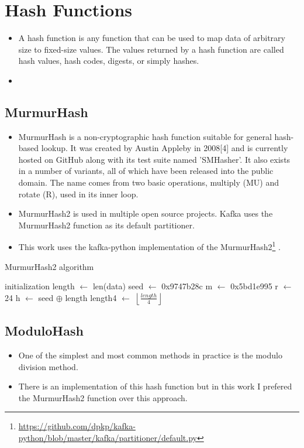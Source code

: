 \section{Hash Functions}
\label{sec:hash-functions}
\begin{itemize}
    \item A hash function is any function that can be used to map data of arbitrary size to fixed-size values. The values returned by a hash function are called hash values, hash codes, digests, or simply hashes.
    \item 
\end{itemize}


\subsection{MurmurHash}
\label{subsec:murmurhash}
\begin{itemize}
    \item MurmurHash is a non-cryptographic hash function suitable for general hash-based lookup. It was created by Austin Appleby in 2008[4] and is currently hosted on GitHub along with its test suite named 'SMHasher'. It also exists in a number of variants, all of which have been released into the public domain. The name comes from two basic operations, multiply (MU) and rotate (R), used in its inner loop.
    \item MurmurHash2 is used in multiple open source projects. Kafka uses the MurmurHash2 function as its default partitioner.
    \item This work uses the kafka-python implementation of the MurmurHash2\footnote{\url{https://github.com/dpkp/kafka-python/blob/master/kafka/partitioner/default.py}} .
\end{itemize}

\begin{algorithm}[H]
	\caption{MurmurHash2 algorithm}
	
	\SetAlgoLined
	
	initialization\;
    length $\leftarrow$ len(data)\;
    seed $\leftarrow$ 0x9747b28c\;
    m $\leftarrow$ 0x5bd1e995\;
    r $\leftarrow$ 24\;
    h $\leftarrow$ seed $\oplus$ length\;
    length4 $\leftarrow$ $\left \lfloor \frac{length}{4} \right \rfloor$ \;
\end{algorithm}

\subsection{ModuloHash}
\begin{itemize}
    \item One of the simplest and most common methods in practice is the modulo division method.
    \item There is an implementation of this hash function but in this work I prefered the MurmurHash2 function over this approach.
\end{itemize}
